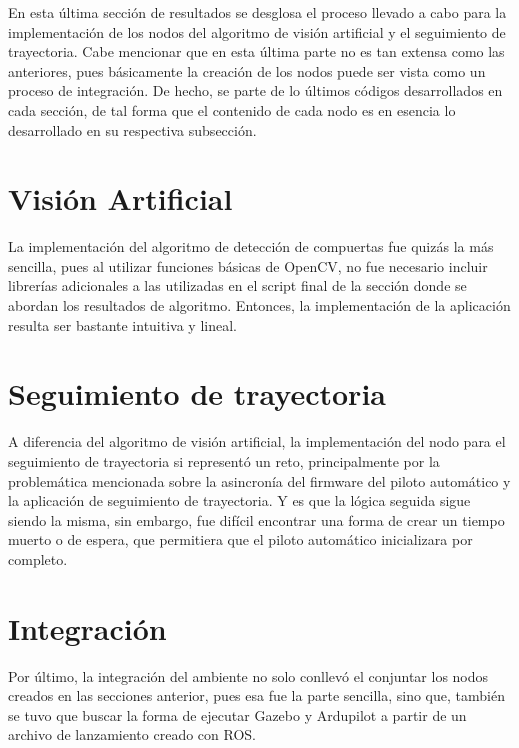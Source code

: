En esta última sección de resultados se desglosa el proceso llevado a cabo para la implementación de los nodos del algoritmo de visión artificial y el seguimiento de trayectoria. Cabe mencionar que en esta última parte no es tan extensa como las anteriores, pues básicamente la creación de los nodos puede ser vista como un proceso de integración. De hecho, se parte de lo últimos códigos desarrollados en cada sección, de tal forma que el contenido de cada nodo es en esencia lo desarrollado en su respectiva subsección.

\section{Visión Artificial}
La implementación del algoritmo de detección de compuertas fue quizás la más sencilla, pues al utilizar funciones básicas de OpenCV, no fue necesario incluir librerías adicionales a las utilizadas en el script final de la sección donde se abordan los resultados de algoritmo. Entonces, la implementación de la aplicación resulta ser bastante intuitiva y lineal.

\section{Seguimiento de trayectoria}
A diferencia del algoritmo de visión artificial, la implementación del nodo para el seguimiento de trayectoria si representó un reto, principalmente por la problemática mencionada sobre la asincronía del firmware del piloto automático y la aplicación de seguimiento de trayectoria. Y es que la lógica seguida sigue siendo la misma, sin embargo, fue difícil encontrar una forma de crear un tiempo muerto o de espera, que permitiera que el piloto automático inicializara por completo.


\section{Integración}
Por último, la integración del ambiente no solo conllevó el conjuntar los nodos creados en las secciones anterior, pues esa fue la parte sencilla, sino que, también se tuvo que buscar la forma de ejecutar Gazebo y Ardupilot a partir de un archivo de lanzamiento creado con ROS.






